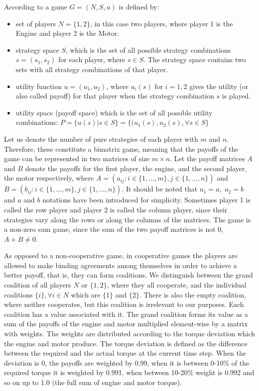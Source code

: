 According to \citet{holler2006einfuhrung} a game $G = (N,S,u)$ is defined by:
\begin{itemize}
\item
set of players $N = \{1,2\}$, in this case two players, where player 1 is the Engine and player 2 is the Motor.
\item
strategy space $S$, which is the set of all possible strategy combinations $s=(s_1,s_2)$ for each player, where $s \in S$. The strategy space contains two sets with all strategy combinations of that player.
\item
utility function $u = (u_1,u_2)$, where $u_i(s)$ for $i=1,2$ gives the utility (or also called payoff) for that player when the strategy combination $s$ is played.
\item
utility space (payoff space) which is the set of all possible utility combinations:
$P = \{u(s)|s \in S\} = \{(u_1(s),u_2(s),  \forall s \in S\}$
\end{itemize} 

Let us denote the number of pure strategies of each player with $m$ and $n$. Therefore, these constitute a bimatrix game, meaning that the payoffs of the game can be represented in two matrices of size $m \times n$. Let the payoff matrices $A$ and $B$ denote the payoffs for the first player, the engine, and the second player, the motor respectively, where $A = (a_{ij}: i \in \{1,...,m\}, j \in \{ 1,...,n\})$ and $B = (b_{ij}: i \in \{1,...,m\}, j \in \{ 1,...,n\})$. It should be noted that $u_1 = a, \; u_2 = b$ and $a$ and $b$ notations have been introduced for simplicity. Sometimes player 1 is called the row player and player 2 is called the column player, since their strategies vary along the rows or along the columns of the matrices. The game is a non-zero sum game, since the sum of the two payoff matrices is not 0, $A + B \neq 0$.

As opposed to a non-cooperative game, in cooperative games the players are allowed to make binding agreements among themselves in order to achieve a better payoff, that is, they can form coalitions. We distinguish between the grand coalition of all players $N$ or $\{1,2\}$, where they all cooperate, and the individual coalitions $\{i\}, \forall i \in N$ which are $\{1\}$ and $\{2\}$. There is also the empty coalition, where neither cooperates, but this coalition is irrelevant to our purposes. Each coalition has a value associated with it. The grand coalition forms its value as a sum of the payoffs of the engine and motor multiplied element-wise by a matrix with weights. The weights are distributed according to the torque deviation which the engine and motor produce. The torque deviation is defined as the difference between the required and the actual torque at the current time step. When the deviation is 0, the payoffs are weighted by 0.99, when it is between 0-10\% of the required torque it is weighted by 0.991, when between 10-20\% weight is 0.992 and so on up to 1.0 (the full sum of engine and motor torque).


